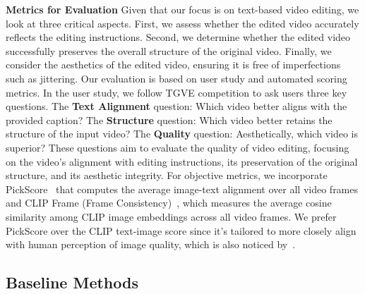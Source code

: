 \noindent\textbf{Metrics for Evaluation}
Given that our focus is on text-based video editing, we look at three critical aspects. First, we assess whether the edited video accurately reflects the editing instructions. Second, we determine whether the edited video successfully preserves the overall structure of the original video. Finally, we consider the aesthetics of the edited video, ensuring it is free of imperfections such as jittering. Our evaluation is based on user study and automated scoring metrics. In the user study, we follow TGVE competition to ask users three key questions. The \textbf{Text Alignment} question: Which video better aligns with the provided caption? The \textbf{Structure} question: Which video better retains the structure of the input video? The \textbf{Quality} question: Aesthetically, which video is superior? These questions aim to evaluate the quality of video editing, focusing on the video's alignment with editing instructions, its preservation of the original structure, and its aesthetic integrity. For objective metrics, we incorporate PickScore~\cite{kirstain2023pick} that computes the average image-text alignment over all video frames and CLIP Frame (Frame Consistency)~\cite{CLIP}, which measures the average cosine similarity among CLIP image embeddings across all video frames. We prefer PickScore over the CLIP text-image score since it's tailored to more closely align with human perception of image quality, which is also noticed by~\cite{podell2023sdxl}.

\subsection{Baseline Methods}


